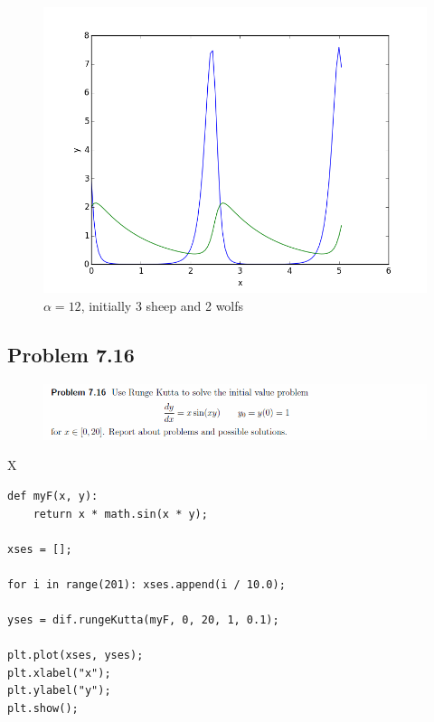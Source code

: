 \begin{figure}[!ht]
\includegraphics[width=1\textwidth]{chapters/images/figure-7-15-3}
\caption{$\alpha = 12$, initially 3 sheep and 2 wolfs}
\end{figure}







\subsection{Problem 7.16}


\begin{figure}[!ht]
\includegraphics[width=1\textwidth]{chapters/images/desc-7-16}
\end{figure}



X

\begin{lstlisting}[caption=todo]
def myF(x, y):
	return x * math.sin(x * y);

xses = [];

for i in range(201): xses.append(i / 10.0);

yses = dif.rungeKutta(myF, 0, 20, 1, 0.1);

plt.plot(xses, yses);
plt.xlabel("x");
plt.ylabel("y");
plt.show();
\end{lstlisting}


